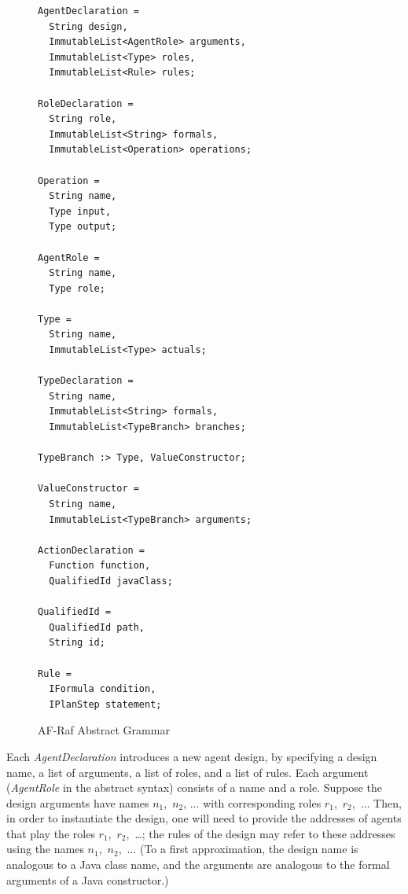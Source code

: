 \documentclass[a4paper,12pt,oneside,fleqn]{book} %
\begin{document}
\begin{figure}\footnotesize %
\begin{verbatim}
AgentDeclaration =
  String design,
  ImmutableList<AgentRole> arguments,
  ImmutableList<Type> roles,
  ImmutableList<Rule> rules;

RoleDeclaration =
  String role,
  ImmutableList<String> formals,
  ImmutableList<Operation> operations;

Operation =
  String name,
  Type input,
  Type output;

AgentRole =
  String name,
  Type role;

Type =
  String name,
  ImmutableList<Type> actuals;

TypeDeclaration =
  String name,
  ImmutableList<String> formals,
  ImmutableList<TypeBranch> branches;

TypeBranch :> Type, ValueConstructor;

ValueConstructor =
  String name,
  ImmutableList<TypeBranch> arguments;

ActionDeclaration =
  Function function,
  QualifiedId javaClass;

QualifiedId =
  QualifiedId path,
  String id;

Rule =
  IFormula condition,
  IPlanStep statement;
\end{verbatim}
\caption{AF-Raf Abstract Grammar}
\label{fig:Abstract-Grammar}
\end{figure}

Each {\it AgentDeclaration\/} introduces a new agent design, by specifying
a design name, a list of arguments, a list of roles, and a list of rules.
Each argument ({\it AgentRole\/} in the abstract syntax) consists of a name
and a role. Suppose the design arguments have names $n_1$,~$n_2$, $\ldots$
with corresponding roles $r_1$,~$r_2$,~$\ldots$ Then, in order to
instantiate the design, one will need to provide the addresses of agents
that play the roles $r_1$,~$r_2$,~\dots; the rules of the design may refer
to these addresses using the names $n_1$,~$n_2$,~$\ldots$ (To a first
approximation, the design name is analogous to a Java class name, and the
arguments are analogous to the formal arguments of a Java constructor.)
\end{document}
